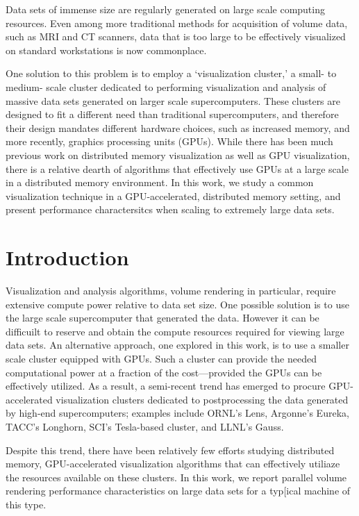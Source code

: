Data sets of immense size are regularly generated on large scale
computing resources.  Even among more traditional methods for
acquisition of volume data, such as MRI and CT scanners, data that is
too large to be effectively visualized on standard workstations is now
commonplace.

One solution to this problem is to employ a `visualization cluster,' a
small- to medium- scale cluster dedicated to performing visualization
and analysis of massive data sets generated on larger scale
supercomputers. These clusters are designed to fit a different
need than traditional supercomputers, and therefore their design
mandates different hardware choices, such as increased memory, and
more recently, graphics processing units (GPUs).  While there has
been much previous work on distributed memory visualization as well
as GPU visualization, there is a relative dearth of algorithms
that effectively use GPUs at a large scale in a distributed memory
environment.  In this work, we study a common visualization technique
in a GPU-accelerated, distributed memory setting, and present
performance charactersitcs when scaling to extremely large data sets.

\section{Introduction}
\label{sec:introduction}

Visualization and analysis algorithms, volume rendering in particular,
require extensive compute power relative to data set size.  One
possible solution is to use the large scale supercomputer that
generated the data.  However it can be difficuilt to reserve and
obtain the compute resources required for viewing large data sets.  An
alternative approach, one explored in this work, is to use a smaller
scale cluster equipped with GPUs.  Such a cluster can provide the
needed computational power at a fraction of the cost---provided the
GPUs can be effectively utilized.  As a result, a semi-recent trend has
emerged to procure GPU-accelerated visualization clusters dedicated
to postprocessing the data generated by high-end supercomputers;
examples include ORNL's Lens, Argonne's Eureka, TACC's Longhorn, SCI's
Tesla-based cluster, and LLNL's Gauss.

Despite this trend, there have been relatively few efforts studying distributed
memory, GPU-accelerated visualization algorithms that can effectively utiliaze
the resources available on these clusters.  In this work, we report parallel
volume rendering performance characteristics on large data sets for a typ[ical
machine of this type.

